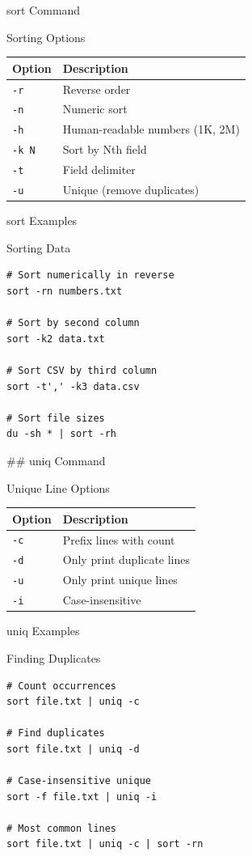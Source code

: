 \documentclass[presentation,aspectratio=1610]{beamer}
\begin{document}
\begin{frame}[label={sec:org50f197f},fragile]{sort Command}
 \begin{block}{Sorting Options}
\begin{center}
\begin{tabular}{ll}
Option & Description\\
\hline
\texttt{-r} & Reverse order\\
\texttt{-n} & Numeric sort\\
\texttt{-h} & Human-readable numbers (1K, 2M)\\
\texttt{-k N} & Sort by Nth field\\
\texttt{-t} & Field delimiter\\
\texttt{-u} & Unique (remove duplicates)\\
\end{tabular}
\end{center}
\end{block}
\end{frame}
\begin{frame}[label={sec:org27e1942},fragile]{sort Examples}
 \begin{block}{Sorting Data}
\begin{verbatim}
# Sort numerically in reverse
sort -rn numbers.txt

# Sort by second column
sort -k2 data.txt

# Sort CSV by third column
sort -t',' -k3 data.csv

# Sort file sizes
du -sh * | sort -rh
\end{verbatim}

\#\# uniq Command
\end{block}
\begin{block}{Unique Line Options}
\begin{center}
\begin{tabular}{ll}
Option & Description\\
\hline
\texttt{-c} & Prefix lines with count\\
\texttt{-d} & Only print duplicate lines\\
\texttt{-u} & Only print unique lines\\
\texttt{-i} & Case-insensitive\\
\end{tabular}
\end{center}
\end{block}
\end{frame}
\begin{frame}[label={sec:orgb08e8ae},fragile]{uniq Examples}
 \begin{block}{Finding Duplicates}
\begin{verbatim}
# Count occurrences
sort file.txt | uniq -c

# Find duplicates
sort file.txt | uniq -d

# Case-insensitive unique
sort -f file.txt | uniq -i

# Most common lines
sort file.txt | uniq -c | sort -rn
\end{verbatim}
\end{block}
\end{frame}
\end{document}
